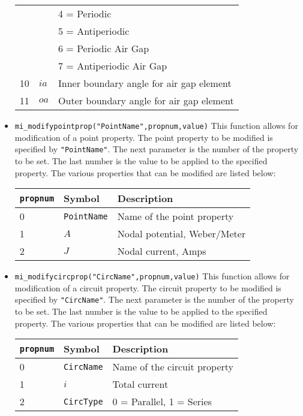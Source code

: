 \begin{itemize}
\begin{center}
\begin{tabular}{lll}
   &                 & 4 = Periodic \\
   &                 & 5 = Antiperiodic \\ 
   &                 & 6 = Periodic Air Gap \\ 
   &                 & 7 = Antiperiodic Air Gap \\ 
10 & $ia$ &  Inner boundary angle for air gap element \\
11 & $oa$ & Outer boundary angle for air gap element \\ \hline
\end{tabular}
\end{center}
\item{\verb+mi_modifypointprop("PointName",propnum,value)+}
This function allows for modification of a point property. The
point property to be modified is specified by {\tt "PointName"}.
The next parameter is the number of the property to be set. The
last number is the value to be applied to the specified property.
The various properties that can be modified are listed below:
\begin{center}
\begin{tabular}{lll} \hline
{\tt propnum}& Symbol & Description \\ \hline
 0 & {\tt PointName} & Name of the point property \\
 1 & $A$ & Nodal potential, Weber/Meter \\
 2 & $J$ & Nodal current, Amps \\ \hline
\end{tabular}
\end{center}
\item{\verb+mi_modifycircprop("CircName",propnum,value)+}
This function allows for modification of a circuit property. The
circuit property to be modified is specified by {\tt "CircName"}.
The next parameter is the number of the property to be set. The
last number is the value to be applied to the specified property.
The various properties that can be modified are listed below:
\begin{center}
\begin{tabular}{lll} \hline
{\tt propnum}& Symbol & Description \\ \hline
 0 & {\tt CircName} & Name of the circuit property \\
 1 & $i$ & Total current \\
 2 & {\tt CircType} & 0 = Parallel, 1 = Series \\ \hline
 \end{tabular}
 \end{center}
\end{itemize}

